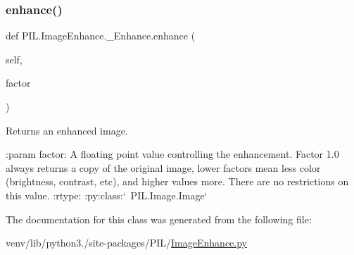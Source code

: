 \subsubsection{\texorpdfstring{enhance()}{enhance()}}
{\footnotesize\ttfamily def P\+I\+L.\+Image\+Enhance.\+\_\+\+Enhance.\+enhance (\begin{DoxyParamCaption}\item[{}]{self,  }\item[{}]{factor }\end{DoxyParamCaption})}

\begin{DoxyVerb}Returns an enhanced image.

:param factor: A floating point value controlling the enhancement.
       Factor 1.0 always returns a copy of the original image,
       lower factors mean less color (brightness, contrast,
       etc), and higher values more. There are no restrictions
       on this value.
:rtype: :py:class:`~PIL.Image.Image`
\end{DoxyVerb}
 

The documentation for this class was generated from the following file\+:\begin{DoxyCompactItemize}
\item 
venv/lib/python3./site-\/packages/\+P\+I\+L/\hyperlink{ImageEnhance_8py}{Image\+Enhance.\+py}\end{DoxyCompactItemize}

